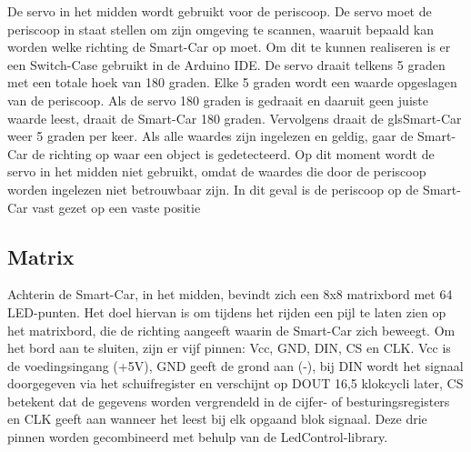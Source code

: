De servo in het midden wordt gebruikt voor de periscoop. De servo moet de periscoop in staat stellen om zijn omgeving te scannen, waaruit bepaald kan worden welke richting de \gls{Smart-Car} op moet. Om dit te kunnen realiseren is er een Switch-Case gebruikt in de Arduino IDE. De servo draait telkens 5 graden met een totale hoek van 180 graden. Elke 5 graden wordt een waarde opgeslagen van de periscoop. Als de servo 180 graden is gedraait en daaruit geen juiste waarde leest, draait de \gls{Smart-Car} 180 graden. Vervolgens draait de gls{Smart-Car} weer 5 graden per keer. Als alle waardes zijn ingelezen en geldig, gaar de \gls{Smart-Car} de richting op waar een object is gedetecteerd. 
Op dit moment wordt de servo in het midden niet gebruikt, omdat de waardes die door de periscoop worden ingelezen niet betrouwbaar zijn. In dit geval is de periscoop op de \gls{Smart-Car} vast gezet op een vaste positie


\subsection{Matrix}
Achterin de \gls{Smart-Car}, in het midden, bevindt zich een 8x8 matrixbord met 64 LED-punten. Het doel hiervan is om tijdens het rijden een pijl te laten zien op het matrixbord, die de richting aangeeft waarin de \gls{Smart-Car} zich beweegt. Om het bord aan te sluiten, zijn er vijf pinnen: Vcc, GND, DIN, CS en CLK. Vcc is de voedingsingang (+5V), GND geeft de grond aan (-), bij DIN wordt het signaal doorgegeven via het schuifregister en verschijnt op DOUT 16,5 klokcycli later, CS betekent dat de gegevens worden vergrendeld in de cijfer- of besturingsregisters en CLK geeft aan wanneer het leest bij elk opgaand blok signaal. Deze drie pinnen worden gecombineerd met behulp van de LedControl-library.

